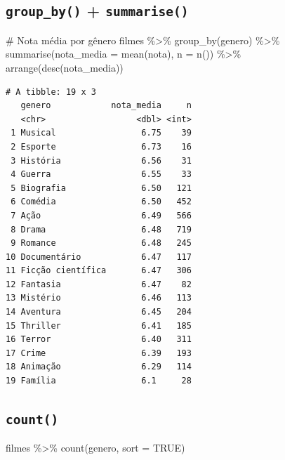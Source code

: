 \documentclass[
  letterpaper,
]{scrbook}
\newenvironment{Shaded}{\begin{snugshade}}{\end{snugshade}}
\newcommand{\AttributeTok}[1]{\textcolor[rgb]{0.40,0.45,0.13}{#1}}
\newcommand{\CommentTok}[1]{\textcolor[rgb]{0.37,0.37,0.37}{#1}}
\newcommand{\ConstantTok}[1]{\textcolor[rgb]{0.56,0.35,0.01}{#1}}
\newcommand{\FunctionTok}[1]{\textcolor[rgb]{0.28,0.35,0.67}{#1}}
\newcommand{\NormalTok}[1]{\textcolor[rgb]{0.00,0.23,0.31}{#1}}
\newcommand{\SpecialCharTok}[1]{\textcolor[rgb]{0.37,0.37,0.37}{#1}}
\begin{document}
\subsection{\texorpdfstring{\texttt{group\_by()} +
\texttt{summarise()}}{group\_by() + summarise()}}\label{group_by-summarise}

\begin{Shaded}
\begin{Highlighting}[]
\CommentTok{\# Nota média por gênero}
\NormalTok{filmes }\SpecialCharTok{\%\textgreater{}\%}
  \FunctionTok{group\_by}\NormalTok{(genero) }\SpecialCharTok{\%\textgreater{}\%}
  \FunctionTok{summarise}\NormalTok{(}\AttributeTok{nota\_media =} \FunctionTok{mean}\NormalTok{(nota), }\AttributeTok{n =} \FunctionTok{n}\NormalTok{()) }\SpecialCharTok{\%\textgreater{}\%}
  \FunctionTok{arrange}\NormalTok{(}\FunctionTok{desc}\NormalTok{(nota\_media))}
\end{Highlighting}
\end{Shaded}

\begin{verbatim}
# A tibble: 19 x 3
   genero            nota_media     n
   <chr>                  <dbl> <int>
 1 Musical                 6.75    39
 2 Esporte                 6.73    16
 3 História                6.56    31
 4 Guerra                  6.55    33
 5 Biografia               6.50   121
 6 Comédia                 6.50   452
 7 Ação                    6.49   566
 8 Drama                   6.48   719
 9 Romance                 6.48   245
10 Documentário            6.47   117
11 Ficção científica       6.47   306
12 Fantasia                6.47    82
13 Mistério                6.46   113
14 Aventura                6.45   204
15 Thriller                6.41   185
16 Terror                  6.40   311
17 Crime                   6.39   193
18 Animação                6.29   114
19 Família                 6.1     28
\end{verbatim}

\subsection{\texorpdfstring{\texttt{count()}}{count()}}\label{count}

\begin{Shaded}
\begin{Highlighting}[]
\NormalTok{filmes }\SpecialCharTok{\%\textgreater{}\%} \FunctionTok{count}\NormalTok{(genero, }\AttributeTok{sort =} \ConstantTok{TRUE}\NormalTok{)}
\end{Highlighting}
\end{Shaded}
\end{document}

